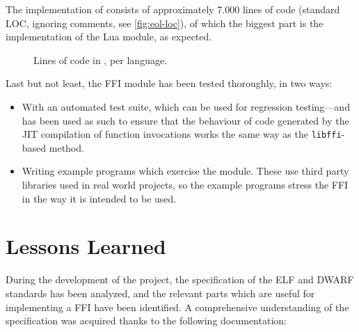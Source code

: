 The implementation of \Eol* consists of approximately 7.000 lines of code (standard LOC, ignoring comments, see
\autoref{fig:eol-loc}), of which the biggest part is the implementation of the
\Eol* Lua module, as expected.

\begin{figure}[ht]
	\centering
	\caption{Lines of code in \Eol*, per language.}
	\label{fig:eol-loc}
\end{figure}

Last but not least, the \Eol* FFI module has been tested thoroughly, in two
ways:

\begin{itemize}

	\item With an automated test suite, which can be used for regression
	testing—and has been used as such to ensure that the behaviour of code
	generated by the JIT compilation of function invocations works the same
	way as the \verb|libffi|-based method.

	\item Writing example programs which exercise the module. These use third
	party libraries used in real world projects, so the example programs
	stress the FFI in the way it is intended to be used.

\end{itemize}



\section{Lessons Learned}

During the development of the project, the specification of the ELF and DWARF
standards has been analyzed, and the relevant parts which are useful for
implementing a \gls{FFI} have been identified. A comprehensive understanding
of the specification was acquired thanks to the following documentation:

